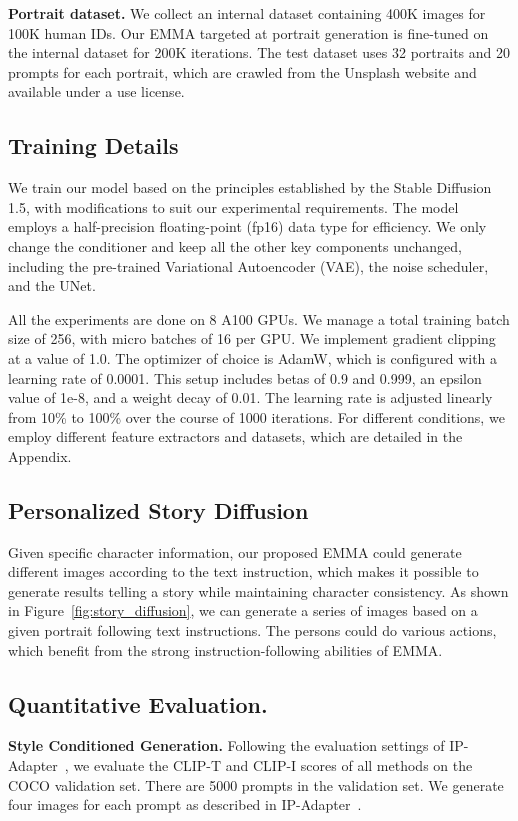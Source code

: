 \textbf{Portrait dataset.} We collect an internal dataset containing 400K images for 100K human IDs. Our EMMA targeted at portrait generation is fine-tuned on the internal dataset for 200K iterations. The test dataset uses 32 portraits and 20 prompts for each portrait, which are crawled from the Unsplash website and available under a use license. 

\subsection{Training Details}

We train our model based on the principles established by the Stable Diffusion 1.5, with modifications to suit our experimental requirements. The model employs a half-precision floating-point (fp16) data type for efficiency. We only change the conditioner and keep all the other key components unchanged, including the pre-trained Variational Autoencoder (VAE), the noise scheduler, and the UNet.

All the experiments are done on 8 A100 GPUs. We manage a total training batch size of 256, with micro batches of 16 per GPU. We implement gradient clipping at a value of 1.0.
The optimizer of choice is AdamW, which is configured with a learning rate of 0.0001. This setup includes betas of 0.9 and 0.999, an epsilon value of 1e-8, and a weight decay of 0.01. The learning rate is adjusted linearly from 10\% to 100\% over the course of 1000 iterations.
For different conditions, we employ different feature extractors and datasets, which are detailed in the Appendix. 

\subsection{Personalized Story Diffusion } Given specific character information, our proposed EMMA could generate different images according to the text instruction, which makes it possible to generate results telling a story while maintaining character consistency. As shown in Figure~\ref{fig:story_diffusion}, we can generate a series of images based on a given portrait following text instructions. The persons could do various actions, which benefit from the strong instruction-following abilities of EMMA. 



\subsection{Quantitative Evaluation.}
\textbf{Style Conditioned Generation.} Following the evaluation settings of IP-Adapter~\cite{ye2023ip}, we evaluate the CLIP-T and CLIP-I scores of all methods on the COCO validation set. There are 5000 prompts in the validation set. We generate four images for each prompt as described in IP-Adapter~\cite{ye2023ip}.

